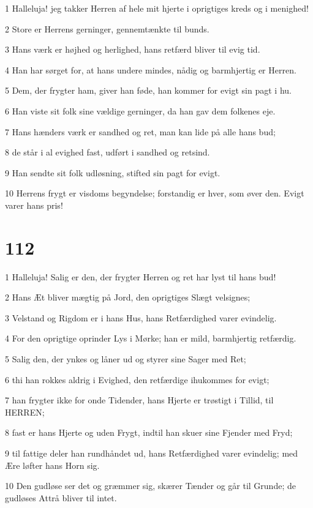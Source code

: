 \par 1 Halleluja! jeg takker Herren af hele mit hjerte i oprigtiges kreds og i menighed!
\par 2 Store er Herrens gerninger, gennemtænkte til bunds.
\par 3 Hans værk er højhed og herlighed, hans retfærd bliver til evig tid.
\par 4 Han har sørget for, at hans undere mindes, nådig og barmhjertig er Herren.
\par 5 Dem, der frygter ham, giver han føde, han kommer for evigt sin pagt i hu.
\par 6 Han viste sit folk sine vældige gerninger, da han gav dem folkenes eje.
\par 7 Hans hænders værk er sandhed og ret, man kan lide på alle hans bud;
\par 8 de står i al evighed fast, udført i sandhed og retsind.
\par 9 Han sendte sit folk udløsning, stifted sin pagt for evigt.
\par 10 Herrens frygt er visdoms begyndelse; forstandig er hver, som øver den. Evigt varer hans pris!

\chapter{112}

\par 1 Halleluja! Salig er den, der frygter Herren og ret har lyst til hans bud!
\par 2 Hans Æt bliver mægtig på Jord, den oprigtiges Slægt velsignes;
\par 3 Velstand og Rigdom er i hans Hus, hans Retfærdighed varer evindelig.
\par 4 For den oprigtige oprinder Lys i Mørke; han er mild, barmhjertig retfærdig.
\par 5 Salig den, der ynkes og låner ud og styrer sine Sager med Ret;
\par 6 thi han rokkes aldrig i Evighed, den retfærdige ihukommes for evigt;
\par 7 han frygter ikke for onde Tidender, hans Hjerte er trøstigt i Tillid, til HERREN;
\par 8 fast er hans Hjerte og uden Frygt, indtil han skuer sine Fjender med Fryd;
\par 9 til fattige deler han rundhåndet ud, hans Retfærdighed varer evindelig; med Ære løfter hans Horn sig.
\par 10 Den gudløse ser det og græmmer sig, skærer Tænder og går til Grunde; de gudløses Attrå bliver til intet.

